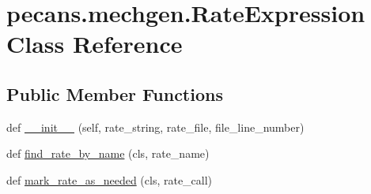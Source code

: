\hypertarget{classpecans_1_1mechgen_1_1RateExpression}{}\section{pecans.\+mechgen.\+Rate\+Expression Class Reference}
\label{classpecans_1_1mechgen_1_1RateExpression}
\subsection*{Public Member Functions}
\begin{DoxyCompactItemize}
\item 
def \hyperlink{classpecans_1_1mechgen_1_1RateExpression_aa70aebc347ad75a2d7a0ceeb652e6f6e}{\+\_\+\+\_\+init\+\_\+\+\_\+} (self, rate\+\_\+string, rate\+\_\+file, file\+\_\+line\+\_\+number)
\item 
def \hyperlink{classpecans_1_1mechgen_1_1RateExpression_a5f155e602ddebc7fd0a0e4b0a9f29cd9}{find\+\_\+rate\+\_\+by\+\_\+name} (cls, rate\+\_\+name)
\item 
def \hyperlink{classpecans_1_1mechgen_1_1RateExpression_af803879fa43b9fd746bfd9b66c4d2d1f}{mark\+\_\+rate\+\_\+as\+\_\+needed} (cls, rate\+\_\+call)
\end{DoxyCompactItemize}
